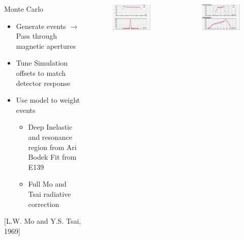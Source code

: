 \documentclass[12pt,usenames,dvipsnames]{beamer}
\begin{document}
\begin{frame}{}
\begin{columns}
	\begin{block}{Monte Carlo}
		\begin{itemize}
			\item Generate events $\rightarrow$ Pass through magnetic apertures
			\item Tune Simulation offsets to match detector response
			\item Use model to weight events
			\begin{itemize}
				\item Deep Inelastic and resonance region from Ari Bodek Fit from E139 
				\item Full Mo and Tsai radiative correction
			\end{itemize}
		\end{itemize}
		\cite{bodek}  
		[L.W. Mo and Y.S. Tsai, 1969] 
	\end{block}
	\vspace{-20pt}
	\begin{figure}
		\includegraphics[width=6cm]{../images/dp_ytar_1207.png}
	\end{figure}
	\vspace{-30pt}
	\begin{figure}
		\includegraphics[width=6cm]{../images/xp_yp_foc_1207.png}
	\end{figure}
\end{columns}
\end{frame}
\end{document}
